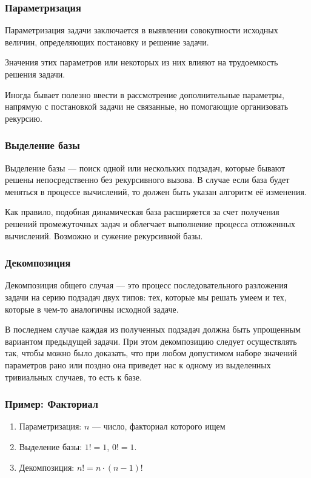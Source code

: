 		\begin{frame}
\frametitle{Параметризация}

Параметризация задачи заключается в выявлении совокупности исходных величин, определяющих постановку и решение задачи. 

Значения этих параметров или некоторых из них влияют на трудоемкость решения задачи. 

Иногда бывает полезно ввести в рассмотрение дополнительные параметры, напрямую с постановкой задачи не связанные, но помогающие организовать рекурсию.

\end{frame}

		\begin{frame}
\frametitle{Выделение базы}

Выделение базы --- поиск одной или нескольких подзадач, которые бывают решены непосредственно без рекурсивного вызова. В случае если база будет меняться в процессе вычислений, то должен быть указан алгоритм её изменения. 

Как правило, подобная динамическая база расширяется за счет получения решений промежуточных задач и облегчает выполнение процесса отложенных вычислений. Возможно и сужение рекурсивной базы.

\end{frame}

		\begin{frame}
\frametitle{Декомпозиция}

Декомпозиция общего случая --- это процесс последовательного разложения задачи на серию подзадач двух типов: тех, которые мы решать умеем и тех, которые в чем-то аналогичны исходной задаче. 

В последнем случае каждая из полученных подзадач должна быть упрощенным вариантом предыдущей задачи. При этом декомпозицию следует осуществлять так, чтобы можно было доказать, что при любом допустимом наборе значений параметров рано или поздно она приведет нас к одному из выделенных тривиальных случаев, то есть к базе.

\end{frame}

\begin{frame}
\frametitle{Пример: Факториал}


\begin{enumerate}
	\item Параметризация: $n$ --- число, факториал которого ищем
	\item Выделение базы: $1!=1$, $0!=1$.
	\item Декомпозиция: $n!=n\cdot(n-1)!$
\end{enumerate}


\end{frame}

